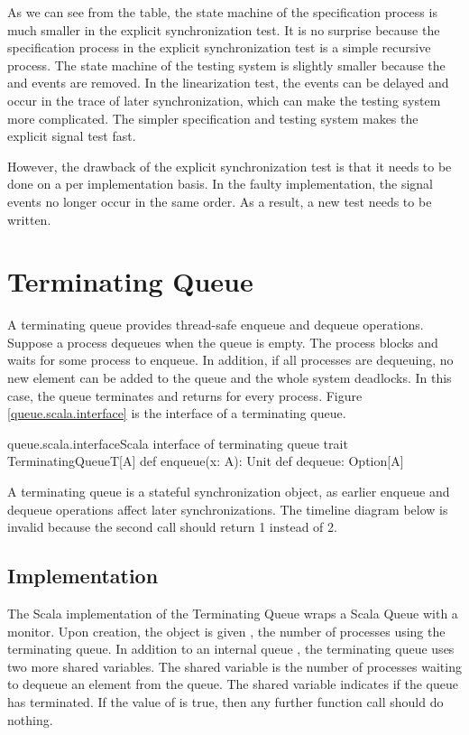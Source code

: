 \documentclass[a4paper, 12pt]{article}
\begin{document}
As we can see from the table, the state machine of the specification process is much smaller in the explicit synchronization test. It is no surprise because the specification process in the explicit synchronization test is a simple recursive process. The state machine of the testing system is slightly smaller because the  and  events are removed. In the linearization test, the  events can be delayed and occur in the trace of later synchronization, which can make the testing system more complicated. The simpler specification and testing system makes the explicit signal test fast.  

However, the drawback of the explicit synchronization test is that it needs to be done on a per implementation basis. In the faulty implementation, the signal events no longer occur in the same order. As a result,  a new test needs to be written. 

\newpage
\section{Terminating Queue}
A terminating queue provides thread-safe enqueue and dequeue operations. Suppose a process dequeues when the queue is empty. The process blocks and waits for some process to enqueue. In addition, if all processes are dequeuing, no new element can be added to the queue and the whole system deadlocks. In this case, the queue terminates and returns  for every process. Figure \ref{queue.scala.interface} is the interface of a terminating queue.

\begin{scalafloat}{queue.scala.interface}{Scala interface of terminating queue}
trait TerminatingQueueT[A]{ 
  def enqueue(x: A): Unit
  def dequeue: Option[A] 
}
\end{scalafloat}

A terminating queue is a stateful synchronization object, as earlier enqueue and dequeue operations affect later synchronizations. The timeline diagram below is invalid because the second  call should return 1 instead of 2. 


\subsection{Implementation}
The Scala implementation of the Terminating Queue wraps a Scala Queue with a monitor. Upon creation, the object is given , the number of processes using the terminating queue. In addition to an internal queue , the terminating queue uses two more shared variables. The shared variable  is the number of processes waiting to dequeue an element from the queue. The shared variable  indicates if the queue has terminated. If the value of  is true, then any further function call should do nothing.
\end{document}
